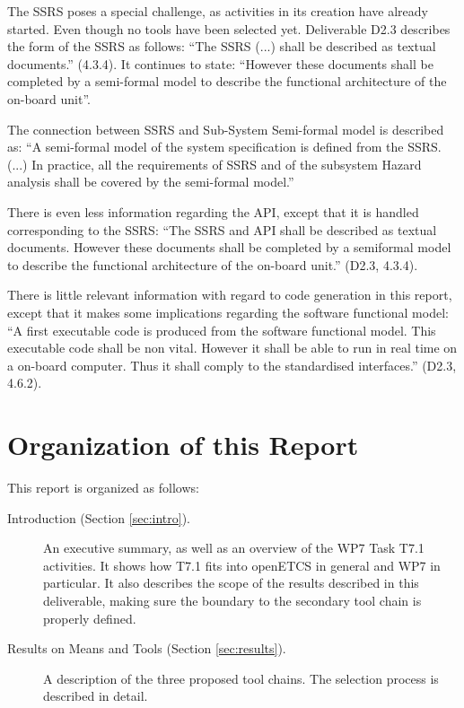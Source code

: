 The SSRS poses a special challenge, as activities in its creation have already started.  Even though no tools have been selected yet.  Deliverable D2.3 describes the form of the SSRS as follows:
``The SSRS (...) shall be described as textual documents.'' (4.3.4).  It continues to state: ``However these documents shall be completed by a semi-formal model to describe the functional architecture of the on-board unit''.

The connection between SSRS and Sub-System Semi-formal model is described as: ``A semi-formal model of the system specification is defined from the SSRS. (...) In practice, all the requirements of SSRS and of the subsystem Hazard analysis shall be covered by the semi-formal model.''

There is even less information regarding the API, except that it is handled corresponding to the SSRS: ``The SSRS and API shall be described as textual documents. However these documents shall be completed by a semiformal model to describe the functional architecture of the on-board unit.'' (D2.3, 4.3.4).

There is little relevant information with regard to code generation in this report, except that it makes some implications regarding the software functional model: ``A first executable code is produced from the software functional model.  This executable code shall be non vital. However it shall be able to run in real time on a on-board computer.  Thus it shall comply to the standardised interfaces.'' (D2.3, 4.6.2).


\section{Organization of this Report}

This report is organized as follows:

\begin{description}
\item[Introduction (Section \ref{sec:intro}).] An executive summary, as well as an overview of the WP7 Task T7.1 activities.  It shows how T7.1 fits into openETCS in general and WP7 in particular.  It also describes the scope of the results described in this deliverable, making sure the boundary to the secondary tool chain is properly defined.

\item[Results on Means and Tools (Section \ref{sec:results}).] A description of the three proposed tool chains.  The selection process is described in detail.

\end{description}

